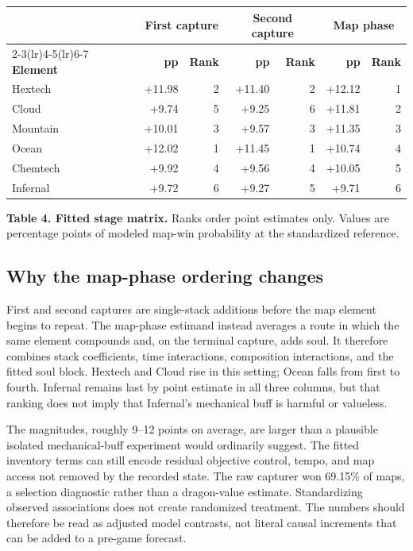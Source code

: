 \documentclass[10pt,letterpaper]{article}
\newcommand{\fineprint}[1]{{\footnotesize\color{muted}#1}}
\begin{document}
\begin{center}
\small
\begin{tabular}{@{}lrrrrrr@{}}
\toprule
& \multicolumn{2}{c}{\textbf{First capture}} & \multicolumn{2}{c}{\textbf{Second capture}} & \multicolumn{2}{c}{\textbf{Map phase}} \\
\cmidrule(lr){2-3}\cmidrule(lr){4-5}\cmidrule(lr){6-7}
\textbf{Element} & \textbf{pp} & \textbf{Rank} & \textbf{pp} & \textbf{Rank} & \textbf{pp} & \textbf{Rank} \\
\midrule
Hextech  & +11.98 & 2 & +11.40 & 2 & +12.12 & 1 \\
Cloud    &  +9.74 & 5 &  +9.25 & 6 & +11.81 & 2 \\
Mountain & +10.01 & 3 &  +9.57 & 3 & +11.35 & 3 \\
Ocean    & +12.02 & 1 & +11.45 & 1 & +10.74 & 4 \\
Chemtech &  +9.92 & 4 &  +9.56 & 4 & +10.05 & 5 \\
Infernal &  +9.72 & 6 &  +9.27 & 5 &  +9.71 & 6 \\
\bottomrule
\end{tabular}
\vspace{0.20em}

\fineprint{\textbf{Table 4. Fitted stage matrix.} Ranks order point estimates only. Values are percentage points of modeled map-win probability at the standardized reference.}
\end{center}

\subsection{Why the map-phase ordering changes}
First and second captures are single-stack additions before the map element begins to repeat. The map-phase estimand instead averages a route in which the same element compounds and, on the terminal capture, adds soul. It therefore combines stack coefficients, time interactions, composition interactions, and the fitted soul block. Hextech and Cloud rise in this setting; Ocean falls from first to fourth. Infernal remains last by point estimate in all three columns, but that ranking does not imply that Infernal's mechanical buff is harmful or valueless.

The magnitudes, roughly 9--12 points on average, are larger than a plausible isolated mechanical-buff experiment would ordinarily suggest. The fitted inventory terms can still encode residual objective control, tempo, and map access not removed by the recorded state. The raw capturer won 69.15\% of maps, a selection diagnostic rather than a dragon-value estimate. Standardizing observed associations does not create randomized treatment. The numbers should therefore be read as adjusted model contrasts, not literal causal increments that can be added to a pre-game forecast.
\end{document}
